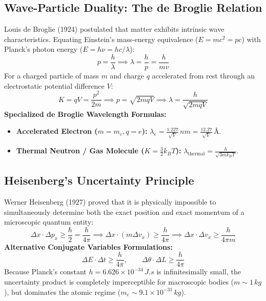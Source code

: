 \documentclass[10pt,a4paper]{article}
\begin{document}
\subsection{Wave-Particle Duality: The de Broglie Relation}
Louis de Broglie (1924) postulated that matter exhibits intrinsic wave characteristics. Equating Einstein's mass-energy equivalence ($E = mc^2 = pc$) with Planck's photon energy ($E = h\nu = hc/\lambda$):
\begin{equation}
  p = \frac{h}{\lambda} \implies \lambda = \frac{h}{p} = \frac{h}{m v}
\end{equation}
For a charged particle of mass $m$ and charge $q$ accelerated from rest through an electrostatic potential difference $V$:
\begin{equation}
  K = q V = \frac{p^2}{2m} \implies p = \sqrt{2m q V} \implies \lambda = \frac{h}{\sqrt{2m q V}}
\end{equation}
\textbf{Specialized de Broglie Wavelength Formulas:}
\begin{itemize}
  \item \textbf{Accelerated Electron ($m = m_e, q = e$):} $\lambda_e = \frac{1.227}{\sqrt{V}}\,\si{nm} = \frac{12.27}{\sqrt{V}}\,\text{\AA}$.
  \item \textbf{Thermal Neutron / Gas Molecule ($K = \frac{3}{2}k_B T$):} $\lambda_{\text{thermal}} = \frac{h}{\sqrt{3 m k_B T}}$.
\end{itemize}

\subsection{Heisenberg's Uncertainty Principle}
Werner Heisenberg (1927) proved that it is physically impossible to simultaneously determine both the exact position and exact momentum of a microscopic quantum entity:
\begin{equation}
  \Delta x \cdot \Delta p_x \ge \frac{\hbar}{2} = \frac{h}{4\pi} \implies \Delta x \cdot (m \Delta v_x) \ge \frac{h}{4\pi} \implies \Delta x \cdot \Delta v_x \ge \frac{h}{4\pi m}
\end{equation}
\textbf{Alternative Conjugate Variables Formulations:}
\begin{equation}
  \Delta E \cdot \Delta t \ge \frac{h}{4\pi}, \qquad \Delta \theta \cdot \Delta L \ge \frac{h}{4\pi}
\end{equation}
Because Planck's constant $h = 6.626 \times 10^{-34}\,\si{J.s}$ is infinitesimally small, the uncertainty product is completely imperceptible for macroscopic bodies ($m \sim 1\,\si{kg}$), but dominates the atomic regime ($m_e \sim 9.1 \times 10^{-31}\,\si{kg}$).
\end{document}
